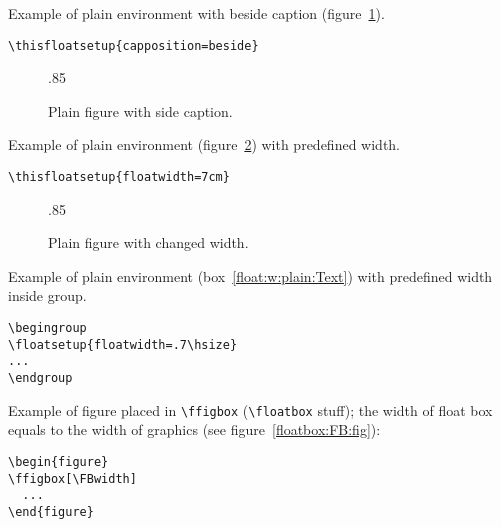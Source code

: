 Example of plain  environment with beside caption (figure~\ref{float:side:fig}).
\begin{verbatim}
\thisfloatsetup{capposition=beside}
\end{verbatim}


\begin{figure}
  {\unitlength.85\unitlength\ifx\pspicture\undefined\else{}\fi
  }%
  \caption{Plain figure with side caption. \text \protect\mpfootnotemark[1]}%
\label{float:side:fig}%
\end{figure}

\Text

\clearpage

Example of plain  environment (figure~\ref{float:W:plain:fig})
with predefined width.
\begin{verbatim}
\thisfloatsetup{floatwidth=7cm}
\end{verbatim}

\begin{figure}
  {\unitlength.85\unitlength\ifx\pspicture\undefined\else{}\fi
  }%
  \caption{Plain figure with changed width.  \text \protect\mpfootnotemark[1]}%
\label{float:W:plain:fig}%
\end{figure}%

\Text

\clearpage
Example of plain  environment (box~\ref{float:w:plain:Text})
with predefined width inside group.
\begin{verbatim}
\begingroup
\floatsetup{floatwidth=.7\hsize}
...
\endgroup
\end{verbatim}


\begingroup
{}
\begin{textbox}
\caption{Plain text box with predefined width. \text}\label{float:w:plain:Text}
\TEXTBOX
\end{textbox}

\Text
\endgroup

\clearpage

Example of figure placed in \verb|\ffigbox| (\verb|\floatbox| stuff);
the width of float box equals  to the width of graphics
(see figure~\ref{floatbox:FB:fig}):
\begin{verbatim}
\begin{figure}
\ffigbox[\FBwidth]
  ...
\end{figure}
\end{verbatim}

